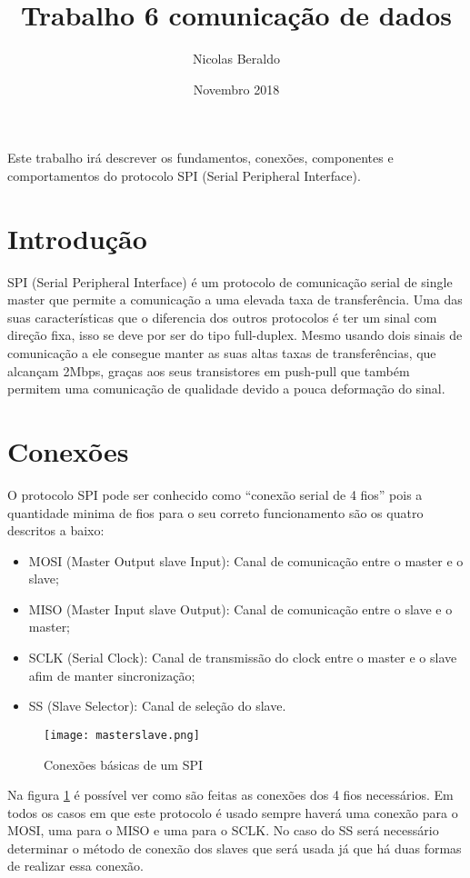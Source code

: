 \documentclass{article}
\title{Trabalho 6 comunicação de dados}
\author{Nicolas Beraldo}
\date{Novembro 2018}
\begin{document}
    \maketitle
        \begin{center}
            Este trabalho irá descrever os fundamentos, conexões, componentes e comportamentos do protocolo SPI (Serial Peripheral Interface).
        \end{center}
    \section*{Introdução}
        SPI (Serial Peripheral Interface) é um protocolo de comunicação serial de single master que permite a comunicação a uma elevada taxa de transferência. Uma das suas características que o diferencia dos outros protocolos é ter um sinal com direção fixa, isso se deve por ser do tipo full-duplex. Mesmo usando dois sinais de comunicação a ele consegue manter as suas altas taxas de transferências, que alcançam 2Mbps, graças aos seus transistores em push-pull que também permitem uma comunicação de qualidade devido a pouca deformação do sinal.
    
    \section*{Conexões}
        O protocolo SPI pode ser conhecido como “conexão serial de 4 fios” pois a quantidade minima de fios para o seu correto funcionamento são os quatro descritos a baixo:
        \begin{itemize}
            \item MOSI (Master Output slave Input): Canal de comunicação entre o master e o slave;
            \item MISO (Master Input slave Output): Canal de comunicação entre o slave e o master;
            \item SCLK (Serial Clock): Canal de transmissão do clock entre o master e o slave afim de manter sincronização;
            \item SS (Slave Selector): Canal de seleção do slave.
        \end{itemize}
        \begin{figure}[H]
            \centering
            \texttt{[image: masterslave.png]}
            \caption{Conexões básicas de um SPI}
            \label{fig:conexoes basicas}
        \end{figure}
        Na figura \ref{fig:conexoes basicas} é possível ver como são feitas as conexões dos 4 fios necessários. Em todos os casos em que este protocolo é usado sempre haverá uma conexão para o MOSI, uma para o MISO e uma para o SCLK. No caso do SS será necessário determinar o método de conexão dos slaves que será usada já que há duas formas de realizar essa conexão.
\end{document}
